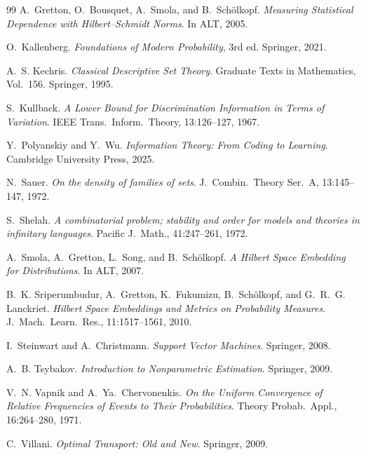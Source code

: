 \begin{thebibliography}{99}
A.~Gretton, O.~Bousquet, A.~Smola, and B.~Sch\"olkopf.
\newblock \emph{Measuring Statistical Dependence with Hilbert--Schmidt Norms}.
\newblock In ALT, 2005.

O.~Kallenberg.
\newblock \emph{Foundations of Modern Probability}, 3rd ed.
\newblock Springer, 2021.

A.~S. Kechris.
\newblock \emph{Classical Descriptive Set Theory}.
\newblock Graduate Texts in Mathematics, Vol.\ 156. Springer, 1995.

S.~Kullback.
\newblock \emph{A Lower Bound for Discrimination Information in Terms of Variation}.
\newblock IEEE Trans.\ Inform.\ Theory, 13:126--127, 1967.

Y.~Polyanskiy and Y.~Wu.
\newblock \emph{Information Theory: From Coding to Learning}.
\newblock Cambridge University Press, 2025.

N.~Sauer.
\newblock \emph{On the density of families of sets}.
\newblock J.\ Combin.\ Theory Ser.\ A, 13:145--147, 1972.

S.~Shelah.
\newblock \emph{A combinatorial problem; stability and order for models and theories in infinitary languages}.
\newblock Pacific J.\ Math., 41:247--261, 1972.

A.~Smola, A.~Gretton, L.~Song, and B.~Sch\"olkopf.
\newblock \emph{A Hilbert Space Embedding for Distributions}.
\newblock In ALT, 2007.

B.~K. Sriperumbudur, A.~Gretton, K.~Fukumizu, B.~Sch\"olkopf, and G.~R.~G. Lanckriet.
\newblock \emph{Hilbert Space Embeddings and Metrics on Probability Measures}.
\newblock J.\ Mach.\ Learn.\ Res., 11:1517--1561, 2010.

I.~Steinwart and A.~Christmann.
\newblock \emph{Support Vector Machines}.
\newblock Springer, 2008.

A.~B. Tsybakov.
\newblock \emph{Introduction to Nonparametric Estimation}.
\newblock Springer, 2009.

V.~N. Vapnik and A.~Ya.\ Chervonenkis.
\newblock \emph{On the Uniform Convergence of Relative Frequencies of Events to Their Probabilities}.
\newblock Theory Probab.\ Appl., 16:264--280, 1971.

C.~Villani.
\newblock \emph{Optimal Transport: Old and New}.
\newblock Springer, 2009.

\end{thebibliography}
